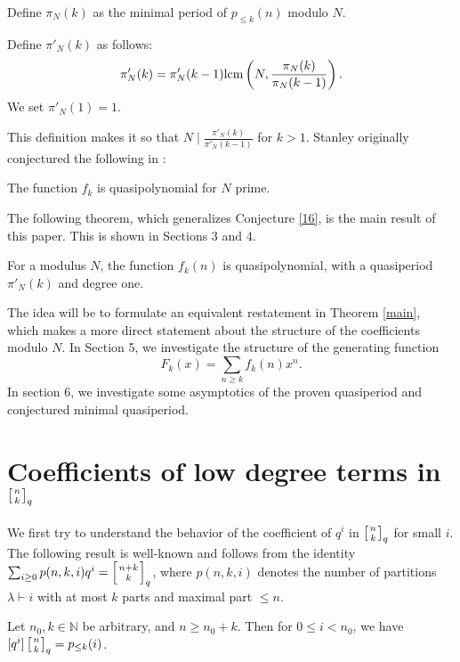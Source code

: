 \documentclass[12pt]{article}
\newcommand{\N}{\mathbb{N}}
\newcommand{\qbinom}[2]{\left[{#1 \atop #2}\right]_q}
\newcommand{\lcm}{\textup{lcm}}
\begin{document}
\begin{definition}
Define $\pi_N(k)$ as the minimal period of $p_{\le k}(n)$ modulo $N$.
\label{17}
\end{definition}

\begin{definition}

Define $\pi'_N(k)$ as follows:
\[\pi'_N(k) = \pi'_N(k-1)\lcm \left(N,\frac{\pi_N(k)}{\pi_N(k-1)}\right). \]
We set $\pi'_N(1)=1$.
\label{18}
\end{definition}

\noindent This definition makes it so that $N\mid \frac{\pi'_N(k)}{\pi'_N(k-1)}$ for $k>1$. Stanley originally conjectured the following in \cite{stanley3}:

\begin{conjecture}
The function $f_{k}$ is quasipolynomial for $N$ prime.
\label{16}
\end{conjecture}

\noindent The following theorem, which generalizes Conjecture \ref{16}, is the main result of this paper. This is shown in Sections 3 and 4.

\begin{theorem}
For a modulus $N$, the function $f_{k}(n)$ is quasipolynomial, with a quasiperiod $\pi'_{N}(k)$ and degree one.
\label{19}
\end{theorem}

\noindent The idea will be to formulate an equivalent restatement in Theorem \ref{main}, which makes a more direct statement about the structure of the coefficients modulo $N$. In Section 5, we investigate the structure of the generating function
\[F_{k}(x) = \sum_{n\ge k}{f_{k}(n)x^n}.\]
In section 6, we investigate some asymptotics of the proven quasiperiod and conjectured minimal quasiperiod.

\section[Coefficients of low degree terms]{Coefficients of low degree terms in $\qbinom{n}{k}$}

We first try to understand the behavior of the coefficient of $q^i$ in $\qbinom{n}{k}$ for small $i$. The following result is well-known and follows from the identity $\sum_{i\ge 0}{p(n,k,i)q^i} = \qbinom{n+k}{k}$, where $p(n,k,i)$ denotes the number of partitions $\lambda \vdash i$ with at most $k$ parts and maximal part $\le n$. 

\begin{lemma}
 \label{21}
Let $n_0 , k\in \N$ be arbitrary, and $n \geq n_0 + k$. Then for $0 \leq i < n_0$, we have $[q^i]\qbinom{n}{k} = p_{\leq k}(i)$.
\end{lemma}
\end{document}
